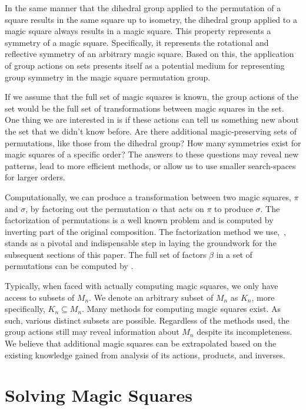 \documentclass{rhumj_new}
\begin{document}
In the same manner that the dihedral group applied to the permutation of a square results in the
same square up to isometry, the dihedral group applied to a magic square always results in a magic
square. This property represents a symmetry of a magic square. Specifically, it represents the
rotational and reflective symmetry of an arbitrary magic square. Based on this, the application of
group actions on sets presents itself as a potential medium for representing group symmetry in the
magic square permutation group.

If we assume that the full set of magic squares is known, the group actions of the set would be the
full set of transformations between magic squares in the set. One thing we are interested in is if
these actions can tell us something new about the set that we didn't know before. Are there
additional magic-preserving sets of permutations, like those from the dihedral group? How many
symmetries exist for magic squares of a specific order? The answers to these questions may reveal
new patterns, lead to more efficient methods, or allow us to use smaller search-spaces for larger
orders.

Computationally, we can produce a transformation between two magic squares, $\pi$ and $\sigma$, by
factoring out the permutation $\alpha$ that acts on $\pi$ to produce $\sigma$. The factorization of
permutations is a well known problem and is computed by inverting part of the original composition.
The factorization method we use,~\unboldmath, stands as a pivotal
and indispensable step in laying the groundwork for the subsequent sections of this paper. The full
set of factors $\beta$ in a set of permutations can be computed by \unboldmath.

Typically, when faced with actually computing magic squares, we only have access to subsets of
$M_n$. We denote an arbitrary subset of $M_n$ as $K_n$, more specifically, $K_n \subseteq M_n$.
Many methods for computing magic squares exist. As such, various distinct subsets are possible.
Regardless of the methods used, the group actions still may reveal information about $M_n$ despite
its incompleteness. We believe that additional magic squares can be extrapolated based on the
existing knowledge gained from analysis of its actions, products, and inverses.

\section{Solving Magic Squares}
\end{document}
